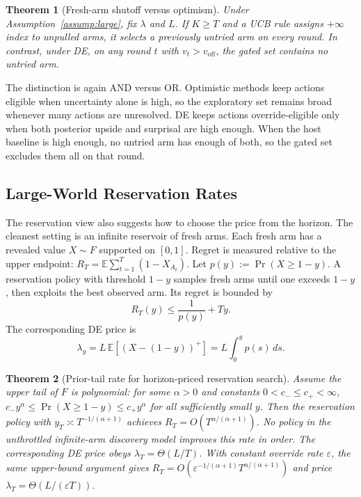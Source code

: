 \documentclass{article}
\newtheorem{theorem} {Theorem}
\newcommand{\E}{\mathbb{E}}
\begin{document}
\begin{theorem}[Fresh-arm shutoff versus optimism]
\label{thm:thermostat}
Under Assumption~\ref{assump:large}, fix $\lambda$ and $L$.
If $K \ge T$ and a UCB rule assigns $+\infty$ index to unpulled arms, it selects a previously untried arm on every round.
In contrast, under DE, on any round $t$ with $v_t > v_{\mathrm{off}}$, the gated set contains no untried arm.
\end{theorem}

The distinction is again AND versus OR.
Optimistic methods keep actions eligible when uncertainty alone is high, so the exploratory set remains broad whenever many actions are unresolved.
DE keeps actions override-eligible only when both posterior upside and surprisal are high enough.
When the host baseline is high enough, no untried arm has enough of both, so the gated set excludes them all on that round.

\subsection{Large-World Reservation Rates}
\label{sec:tail_scaling}

The reservation view also suggests how to choose the price from the horizon.
The cleanest setting is an infinite reservoir of fresh arms.
Each fresh arm has a revealed value $X\sim F$ supported on $[0,1]$.
Regret is measured relative to the upper endpoint:
$R_T = \E\sum_{t=1}^T (1-X_{A_t})$.
Let $p(y):=\Pr(X\ge 1-y)$.
A reservation policy with threshold $1-y$ samples fresh arms until one exceeds $1-y$, then exploits the best observed arm.
Its regret is bounded by
\begin{equation}
\label{eq:threshold_regret}
  R_T(y) \le \frac{1}{p(y)} + Ty.
\end{equation}
The corresponding DE price is
\begin{equation}
\label{eq:tail_price}
  \lambda_y = L\,\E[(X-(1-y))^+] = L\int_0^y p(s)\,ds.
\end{equation}

\begin{theorem}[Prior-tail rate for horizon-priced reservation search]
\label{thm:tail_rate}
Assume the upper tail of $F$ is polynomial: for some $\alpha>0$ and constants $0<c_-\le c_+<\infty$,
$c_-y^\alpha \le \Pr(X\ge 1-y) \le c_+y^\alpha$
for all sufficiently small $y$.
Then the reservation policy with $y_T \asymp T^{-1/(\alpha+1)}$ achieves
$R_T = O(T^{\alpha/(\alpha+1)})$.
No policy in the unthrottled infinite-arm discovery model improves this rate in order.
The corresponding DE price obeys $\lambda_T = \Theta(L/T)$.
With constant override rate $\varepsilon$, the same upper-bound argument gives
$R_T = O(\varepsilon^{-1/(\alpha+1)}T^{\alpha/(\alpha+1)})$
and price $\lambda_T = \Theta(L/(\varepsilon T))$.
\end{theorem}
\end{document}
